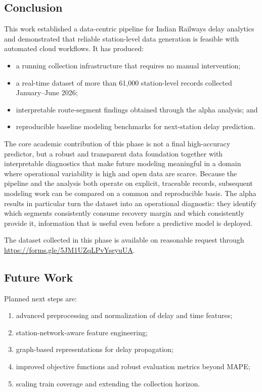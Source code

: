 \documentclass[conference]{IEEEtran}
\begin{document}
\subsection{Conclusion}
This work established a data-centric pipeline for Indian Railways delay analytics and demonstrated that reliable station-level data generation is feasible with automated cloud workflows. It has produced:
\begin{itemize}
    \item a running collection infrastructure that requires no manual intervention;
    \item a real-time dataset of more than 61,000 station-level records collected January--June 2026;
    \item interpretable route-segment findings obtained through the alpha analysis; and
    \item reproducible baseline modeling benchmarks for next-station delay prediction.
\end{itemize}
The core academic contribution of this phase is not a final high-accuracy predictor, but a robust and transparent data foundation together with interpretable diagnostics that make future modeling meaningful in a domain where operational variability is high and open data are scarce. Because the pipeline and the analysis both operate on explicit, traceable records, subsequent modeling work can be compared on a common and reproducible basis. The alpha results in particular turn the dataset into an operational diagnostic: they identify which segments consistently consume recovery margin and which consistently provide it, information that is useful even before a predictive model is deployed.

The dataset collected in this phase is available on reasonable request through \url{https://forms.gle/5JM1UZqLPvYseyuUA}.

\subsection{Future Work}
Planned next steps are:
\begin{enumerate}
    \item advanced preprocessing and normalization of delay and time features;
    \item station-network-aware feature engineering;
    \item graph-based representations for delay propagation;
    \item improved objective functions and robust evaluation metrics beyond MAPE;
    \item scaling train coverage and extending the collection horizon.
\end{enumerate}
\end{document}
